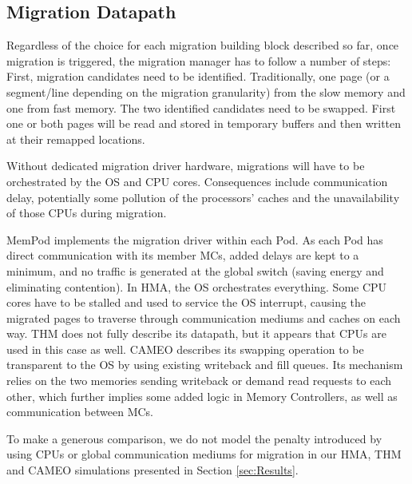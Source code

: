 \subsection{Migration Datapath}

Regardless of the choice for each migration building block described so far, once migration is triggered, the migration manager has to follow a number of 
steps: First, migration candidates need to be identified. Traditionally, one page (or a segment/line depending on the migration granularity) from the slow memory and one from fast memory. The two identified candidates need to be swapped. First one or both pages will be read and stored in temporary buffers and then written at their remapped locations.

Without dedicated migration driver hardware, migrations will have to be orchestrated by the OS and CPU cores. Consequences include communication delay, 
potentially some pollution of the processors' caches 
and the unavailability of those CPUs during migration. 

MemPod implements the migration driver within each Pod. As each Pod has direct communication with its member MCs, added delays are kept to a minimum,
and no traffic is generated at the global switch (saving energy and eliminating contention).
In HMA, the OS orchestrates everything. Some CPU cores have to be stalled and used to service the OS interrupt, causing the migrated pages to traverse through communication mediums and caches on each way. THM does not fully describe its datapath, but it appears that CPUs are used in this case as well. CAMEO describes its swapping operation to be transparent to the OS by using existing writeback and fill queues. Its mechanism relies on the two memories sending writeback or demand read requests to each other, which further implies some added logic in Memory Controllers, as well as communication between MCs.

To make a generous comparison, we do not model the penalty introduced by using CPUs or global communication mediums for migration in our HMA, THM and CAMEO simulations presented in Section \ref{sec:Results}.
